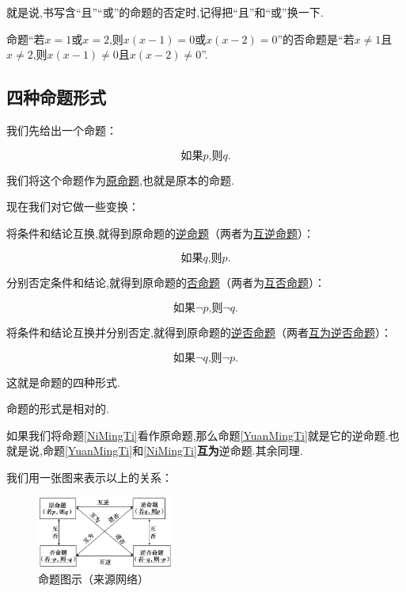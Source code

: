 \documentclass[lang=cn,math=cm,chinesefont=nofont,11pt,scheme=chinese,twocol]{elegantbook}
\begin{document}
就是说,书写含“且”“或”的命题的否定时,记得把“且”和“或”换一下.

\begin{example}
  命题“若$x=1$或$x=2$,则$x(x-1)=0$或$x(x-2)=0$”的否命题是“若$x\neq 1$且$x\neq 2$,则$x(x-1)\neq 0$且$x(x-2)\neq 0$”.
\end{example}

\subsection{四种命题形式}

我们先给出一个命题：

\begin{equation}\label{YuanMingTi}
  \text{如果}p\text{,则}q.
\end{equation}

我们将这个命题作为\underline{原命题},也就是原本的命题.

现在我们对它做一些变换：

将条件和结论互换,就得到原命题的\underline{逆命题}（两者为\underline{互逆命题}）：

\begin{equation}\label{NiMingTi}
  \text{如果}q\text{,则}p.
\end{equation}

分别否定条件和结论,就得到原命题的\underline{否命题}（两者为\underline{互否命题}）：

\begin{equation}\label{FouMingTi}
  \text{如果}\neg p\text{,则}\neg q.
\end{equation}

将条件和结论互换并分别否定,就得到原命题的\underline{逆否命题}（两者\underline{互为逆否命题}）：

\begin{equation}\label{NiFouMingTi}
  \text{如果}\neg q\text{,则}\neg p.
\end{equation}

这就是命题的四种形式.

命题的形式是相对的.

如果我们将命题\ref{NiMingTi}看作原命题,那么命题\ref{YuanMingTi}就是它的逆命题.也就是说,命题\ref{YuanMingTi}和\ref{NiMingTi}\textbf{互为}逆命题.其余同理.

我们用一张图来表示以上的关系：

\begin{figure}[h]
  \centering
  \includegraphics[width=0.4\textwidth]{image/proposition.png}
  \caption{命题图示（来源网络）}
  \label{img:proposition}
\end{figure}
\end{document}
